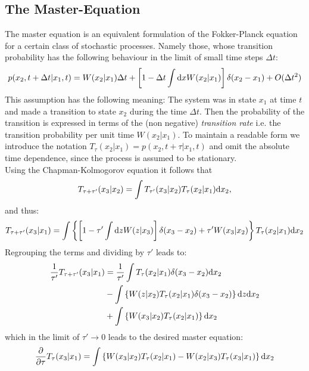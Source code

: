 \subsection{The Master-Equation}
\label{meq}
The master equation is an equivalent formulation of the Fokker-Planck equation for a certain class of stochastic processes. Namely those, whose transition probability has the following behaviour in the limit of small time steps $\Delta t$:
\begin{equation}
    p(x_2,t+\Delta t|x_1,t) = W(x_2|x_1)\Delta t + \left[ 1 - \Delta t \int {\rm d} x W(x_2|x_1) \right] \delta(x_2-x_1) + O(\Delta t ^{2})
    \label{master assumption}
\end{equation}
This assumption has the following meaning: The system was in state $x_1$ at time $t$ and made a transition to state $x_2$ during the time $\Delta t$. Then the probability of the transition is expressed in terms of the (non negative) {\it transition rate} i.e. the transition probability per unit time $W(x_2|x_1)$. To maintain a readable form we introduce the notation $T_\tau (x_2|x_1) = p(x_2,t+\tau|x_1,t)$ and omit the absolute time dependence, since the process is assumed to be stationary. \\
Using the Chapman-Kolmogorov equation it follows that
\begin{equation}
    T_{\tau + \tau'}(x_3|x_2) = \int T_{\tau'}(x_3|x_2)T_{\tau}(x_2|x_1){\rm d} x_2,
    \label{K2}
\end{equation}
and thus:
\begin{equation*}
    T_{\tau+\tau'}(x_3|x_1) = \int \left\{ \left[1 - \tau' \int {\rm d} z W(z|x_3) \right] \delta(x_3 - x_2) + \tau' W(x_3|x_2) \right\} T_{\tau}(x_2|x_1){\rm d} x_2
\end{equation*}
Regrouping the terms and dividing by $\tau ' $ leads to:
\begin{align*}
    \frac{1}{\tau'} T_{\tau+\tau'}(x_3|x_1) &= \frac{1}{\tau'}  \int T_{\tau}(x_2|x_1) \delta(x_3 - x_2){\rm d} x_2\\
    &- \int \left\{ W(z|x_2)  T_{\tau}(x_2|x_1)\delta(x_3 - x_2) \right\}{\rm d} z {\rm d} x_2 \\
    &+ \int \left\{ W(x_3|x_2) T_{\tau}(x_2|x_1) \right\}{\rm d} x_2
\end{align*}
which in the limit of $\tau' \rightarrow 0$ leads to the desired master equation:
\begin{equation}
    \frac{\partial}{\partial \tau}T_{\tau}(x_3|x_1) = \int \left\{ W(x_3|x_2) T_{\tau}(x_2|x_1) - W(x_2|x_3) T_{\tau}(x_3|x_1) \right\}{\rm d} x_2
    \label{continuous_space_master_equation}
\end{equation}
